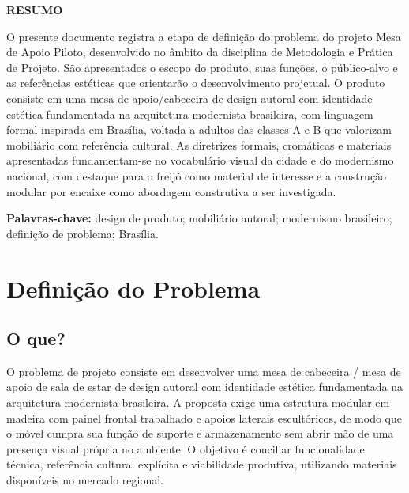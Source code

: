 \documentclass[
  12pt,
  a4paper,
  oneside,
  brazil
]{article}
\newcommand{\secbreak}{\clearpage}
\let\oldsection\section
\renewcommand{\section}{\secbreak\oldsection}
\begin{document}
\clearpage
\thispagestyle{empty}
\begin{center}
  {\normalsize\bfseries RESUMO}
\end{center}

\vspace{1em}
\noindent
O presente documento registra a etapa de definição do problema do projeto
Mesa de Apoio Piloto, desenvolvido no âmbito da disciplina de Metodologia
e Prática de Projeto. São apresentados o escopo do produto, suas funções,
o público-alvo e as referências estéticas que orientarão o desenvolvimento
projetual. O produto consiste em uma mesa de apoio/cabeceira de design autoral
com identidade estética fundamentada na arquitetura modernista brasileira,
com linguagem formal inspirada em Brasília, voltada a adultos das classes A e B
que valorizam mobiliário com referência cultural. As diretrizes formais,
cromáticas e materiais apresentadas fundamentam-se no vocabulário visual
da cidade e do modernismo nacional, com destaque para o freijó como material
de interesse e a construção modular por encaixe como abordagem construtiva
a ser investigada.

\vspace{1em}
\noindent\textbf{Palavras-chave:} design de produto; mobiliário autoral;
modernismo brasileiro; definição de problema; Brasília.

\clearpage
\thispagestyle{empty}
\tableofcontents


\section{Definição do Problema}

\subsection{O que?}

O problema de projeto consiste em desenvolver uma mesa de cabeceira / mesa
de apoio de sala de estar de design autoral com identidade estética
fundamentada na arquitetura modernista brasileira. A proposta exige uma
estrutura modular em madeira com painel frontal trabalhado e apoios laterais
escultóricos, de modo que o móvel cumpra sua função de suporte e
armazenamento sem abrir mão de uma presença visual própria no ambiente.
O objetivo é conciliar funcionalidade técnica, referência cultural explícita
e viabilidade produtiva, utilizando materiais disponíveis no mercado regional.
\end{document}
